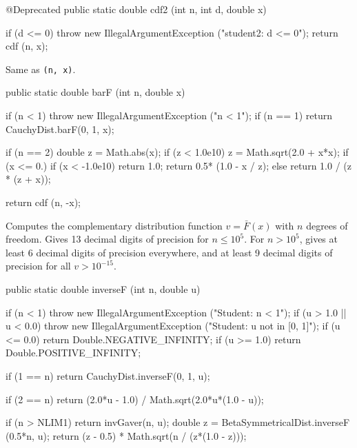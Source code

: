 \begin{code}

   @Deprecated
   public static double cdf2 (int n, int d, double x)\begin{hide} {
      if (d <= 0)
         throw new IllegalArgumentException ("student2:   d <= 0");
      return cdf (n, x);
   }\end{hide}
\end{code}
  \begin{tabb}
Same as \texttt{(n, x)}.
  \end{tabb}
\begin{code}

   public static double barF (int n, double x)\begin{hide} {
      if (n < 1)
        throw new IllegalArgumentException ("n < 1");
      if (n == 1)
         return CauchyDist.barF(0, 1, x);

      if (n == 2) {
         double z = Math.abs(x);
         if (z < 1.0e10)
            z = Math.sqrt(2.0 + x*x);
         if (x <= 0.) {
            if (x < -1.0e10)
               return 1.0;
            return 0.5* (1.0 - x / z);
         } else
            return 1.0 / (z * (z + x));
      }

      return cdf (n, -x);
   }\end{hide}
\end{code}
\begin{tabb} Computes the complementary distribution function $v = \bar{F}(x)$
with $n$ degrees of freedom. Gives 13 decimal digits of precision for $n \le 10^5$.
 For $n >  10^5$, gives  at least 6 decimal digits of precision everywhere, and
 at least 9 decimal digits of precision for all $v >  10^{-15}$.
\end{tabb}
\begin{code}

   public static double inverseF (int n, double u)\begin{hide} {
        if (n < 1)
            throw new IllegalArgumentException ("Student:   n < 1");
        if (u > 1.0 || u < 0.0)
            throw new IllegalArgumentException ("Student:   u not in [0, 1]");
        if (u <= 0.0)
           return Double.NEGATIVE_INFINITY;
        if (u >= 1.0)
           return Double.POSITIVE_INFINITY;

        if (1 == n)
           return CauchyDist.inverseF(0, 1, u);

        if (2 == n)
           return (2.0*u - 1.0) / Math.sqrt(2.0*u*(1.0 - u));

        if (n > NLIM1)
           return invGaver(n, u);
        double z = BetaSymmetricalDist.inverseF (0.5*n, u);
        return (z - 0.5) * Math.sqrt(n / (z*(1.0 - z)));
   }\end{hide}
\end{code}
